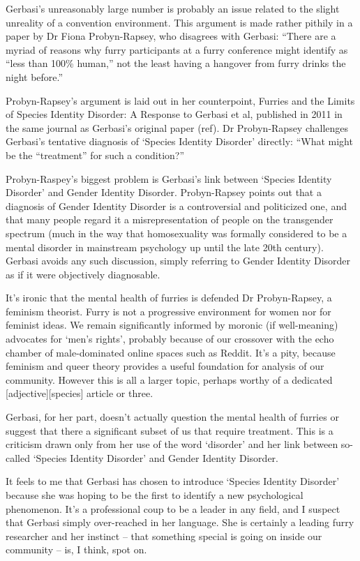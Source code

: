 Gerbasi's unreasonably large number is probably an issue related to the slight unreality of a convention environment. This argument is made rather pithily in a paper by Dr Fiona Probyn-Rapsey, who disagrees with Gerbasi: ``There are a myriad of reasons why furry participants at a furry conference might identify as ``less than 100\% human,'' not the least having a hangover from furry drinks the night before.''

Probyn-Rapsey's argument is laid out in her counterpoint, Furries and the Limits of Species Identity Disorder: A Response to Gerbasi et al, published in 2011 in the same journal as Gerbasi's original paper (ref). Dr Probyn-Rapsey challenges Gerbasi's tentative diagnosis of `Species Identity Disorder' directly: ``What might be the “treatment” for such a condition?''

Probyn-Raspey's biggest problem is Gerbasi's link between `Species Identity Disorder' and Gender Identity Disorder. Probyn-Rapsey points out that a diagnosis of Gender Identity Disorder is a controversial and politicized one, and that many people regard it a misrepresentation of people on the transgender spectrum (much in the way that homosexuality was formally considered to be a mental disorder in mainstream psychology up until the late 20th century). Gerbasi avoids any such discussion, simply referring to Gender Identity Disorder as if it were objectively diagnosable.

It's ironic that the mental health of furries is defended Dr Probyn-Rapsey, a feminism theorist. Furry is not a progressive environment for women nor for feminist ideas. We remain significantly informed by moronic (if well-meaning) advocates for `men's rights', probably because of our crossover with the echo chamber of male-dominated online spaces such as Reddit. It's a pity, because feminism and queer theory provides a useful foundation for analysis of our community. However this is all a larger topic, perhaps worthy of a dedicated [adjective][species] article or three.

Gerbasi, for her part, doesn't actually question the mental health of furries or suggest that there a significant subset of us that require treatment. This is a criticism drawn only from her use of the word `disorder' and her link between so-called `Species Identity Disorder' and Gender Identity Disorder.

It feels to me that Gerbasi has chosen to introduce `Species Identity Disorder' because she was hoping to be the first to identify a new psychological phenomenon. It's a professional coup to be a leader in any field, and I suspect that Gerbasi simply over-reached in her language. She is certainly a leading furry researcher and her instinct -- that something special is going on inside our community -- is, I think, spot on.

